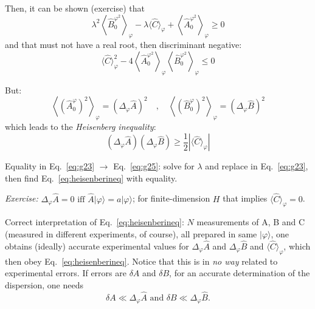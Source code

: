 \documentclass[12pt]{article}
\begin{document}
\begin{enumerate}
%
Then, it can be shown (exercise) that
\begin{equation}
\lambda^{2}\left\langle\hat{B}_{0}^{\varphi^2}\right\rangle_{\varphi}-
\lambda\langle\hat{C}\rangle_{\varphi}+
\left\langle\hat{A}_{0}^{\varphi^{2}}\right\rangle_{\varphi} \geqslant 0
\label{eq:g24}
\end{equation}
and that must not have a real root, then discriminant negative:
\begin{equation}
\langle\hat{C}\rangle_{\varphi}^{2}-4
\left\langle\hat{A}_{0}^{\varphi^{2}}\right\rangle_{\varphi}
\left\langle\hat{B}_{0}^{\varphi^{2}}\right\rangle_{\varphi} \leqslant 0
\label{eq:g25}
\end{equation}
%
\end{enumerate}

But:
\begin{equation}
\left\langle\left(\hat{A}_{0}^{\varphi}\right)^{2}\right\rangle_{\varphi}
=\left(\Delta_{\varphi} \hat{A}\right)^{2}
\quad,\quad
\left\langle\left(\hat{B}_{0}^{\varphi}\right)^{2}\right\rangle_{\varphi}
=\left(\Delta_{\varphi} \hat{B}\right)^{2}
\end{equation}
which leads to the \emph{Heisenberg inequality}:
\begin{equation}
\boxed{
\left(\Delta_{\varphi} \hat{A}\right)\left(\Delta_{\varphi} \hat{B}\right) \geqslant \frac{1}{2}\left|\langle\hat{C}\rangle_{\varphi}\right|
}
\label{eq:heisenberineq}
\end{equation}

Equality in Eq.~\eqref{eq:g23} $\to$ Eq.~\eqref{eq:g25}: solve for $\lambda$ and replace in Eq.~\eqref{eq:g23},
then find Eq.~\eqref{eq:heisenberineq} with equality.

\emph{Exercise:} 
$\Delta_\varphi \hat{A}=0 \textrm{ iff } \hat{A}|\varphi\rangle=a|\varphi\rangle$; 
for finite-dimension $H$ that implies 
$\langle\hat{C}\rangle_{\varphi}=0$.

Correct interpretation of Eq.~\eqref{eq:heisenberineq}:
$N$ measurements of A, B and C (measured in different
experiments, of course), all prepared in same $|\varphi\rangle$,
one obtains (ideally) accurate experimental values for 
$\Delta_{\varphi} \hat{A}$ and 
$\Delta_{\varphi} \hat{B}$ and
$\langle\hat{C}\rangle_{\varphi}$,
which then obey Eq.~\eqref{eq:heisenberineq}. 
Notice that this is in \emph{no way} related to experimental errors.
If errors are $\delta A$ and $\delta B$, for an accurate
determination of the dispersion, one needs
\begin{equation}
\delta A \ll \Delta_{\varphi} \hat{A} \textrm { and } \delta B \ll \Delta_{\varphi} \hat{B}.
\end{equation}
\end{document}
